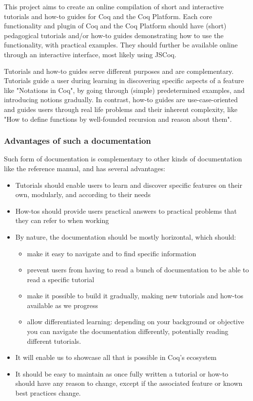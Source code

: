 \documentclass{article}[12pt]
\begin{document}
This project aims to create an online compilation of short and interactive
tutorials and how-to guides for Coq and the Coq Platform.
Each core functionality and plugin of Coq and the Coq Platform should have
(short) pedagogical tutorials and/or how-to guides demonstrating how to use the
functionality, with practical examples. They should further be available online
through an interactive interface, most likely using JSCoq.

Tutorials and how-to guides serve different purposes and are complementary.
Tutorials guide a user during learning in discovering specific aspects of a
feature like "Notations in Coq", by going through (simple) predetermined
examples, and introducing notions gradually. In contrast, how-to guides are
use-case-oriented and guides users through real life problems and their inherent
complexity, like "How to define functions by well-founded recursion and reason
about them".

\subsubsection*{Advantages of such a documentation}

Such form of documentation is complementary to other kinds of documentation like
the reference manual, and has several advantages:

\begin{itemize}[itemsep=0pt]
  \item Tutorials should enable users to learn and discover specific features on
        their own, modularly, and according to their needs
  \item How-tos should provide users practical answers to practical problems
        that they can refer to when working
  \item By nature, the documentation should be mostly horizontal, which should:
    \begin{itemize}[itemsep=0pt]
      \item make it easy to navigate and to find specific information
      \item prevent users from having to read a bunch of documentation to be able to read a specific tutorial
      \item make it possible to build it gradually, making new tutorials and how-tos available as we progress
      \item allow differentiated learning: depending on your background or
            objective you can navigate the documentation differently,
            potentially reading different tutorials.
    \end{itemize}
  \item It will enable us to showcase all that is possible in Coq's ecosystem
  \item It should be easy to maintain as once fully written a tutorial or how-to
        should have any reason to change, except if the associated feature or
        known best practices change.
\end{itemize}
\end{document}
